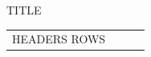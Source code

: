 
\begin{frame}{{{TITLE}}}
    \begin{table}
        \centering
        \renewcommand{\arraystretch}{1.3}
        \begin{tabular}{lccc}
            \toprule
            {{HEADERS}}
            \midrule
            {{ROWS}}
            \bottomrule
        \end{tabular}
    \end{table}
\end{frame}


